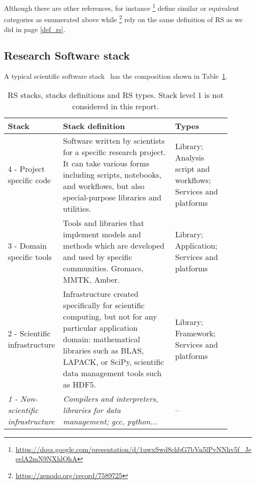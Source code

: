 Although there are other references, for instance \footnote{\url{https://docs.google.com/presentation/d/1uwxSwd8chbG7bVn5lPvNNhv5f_JeeelA2mN9NXhlOhA}} define similar or equivalent categories as enumerated above while \footnote{\url{https://zenodo.org/record/7589725}} rely on the same definition of RS as we did in page \ref{def_rs}.

\subsection{Research Software stack}



A typical scientific software stack~\cite{hinsen2019} has the composition shown in Table~\ref{tab:rs_stacks}.

\begin{center}
\begin{table}[h]
    \small
    \begin{tabular}[t]{|p{0.15\linewidth}|p{0.5\linewidth}|p{0.25\linewidth}|} \hline

    \textbf{Stack} & \textbf{Stack definition} & \textbf{Types} \\ \hline \hline
    4 - Project specific code &
    Software written by scientists for a specific research project. It can take various forms including scripts, notebooks, and workflows, but also special-purpose libraries and utilities. &
    Library; Analysis script and workflows; Services and platforms \\ \hline

    3 - Domain specific tools &
    Tools and libraries that implement models and methods which are developed and used by specific communities. Gromacs, MMTK, Amber. &
    Library; Application; Services and platforms \\ \hline

    2 - Scientific infrastructure &
    Infrastructure created specifically for scientific computing, but not for any particular application domain: mathematical libraries such as BLAS, LAPACK, or SciPy, scientific data management tools such as HDF5. &
    Library; Framework; Services and platforms\\ \hline

    \it{1 - Non-scientific infrastructure} &
    \it{Compilers and interpreters, libraries for data management; gcc, python...} &
    -- \\ \hline

    \end{tabular}
    \caption{RS stacks, stacks definitions and RS types. Stack level 1 is not considered in this report.}
    \label{tab:rs_stacks}
\end{table}
\end{center}


